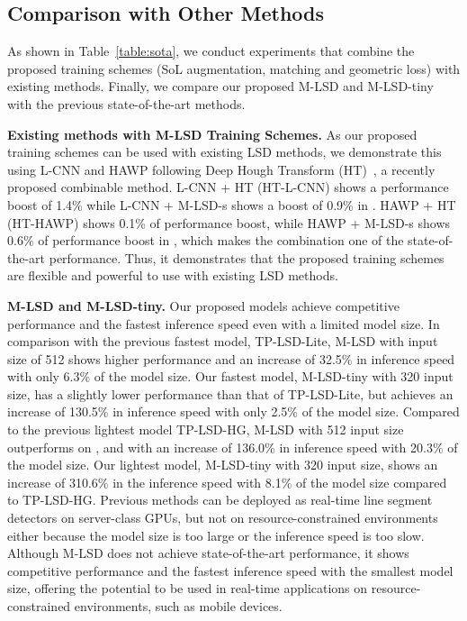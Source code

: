 \documentclass[letterpaper]{article} \usepackage{aaai22}  \usepackage{times}  \usepackage{helvet}  \usepackage{courier}  \usepackage[hyphens]{url}  \usepackage{graphicx} \urlstyle{rm} \def\UrlFont{\rm}  \usepackage{natbib}  \usepackage{caption} \DeclareCaptionStyle{ruled}{labelfont=normalfont,labelsep=colon,strut=off} \frenchspacing  \setlength{\pdfpagewidth}{8.5in}  \setlength{\pdfpageheight}{11in}  \usepackage{algorithm}
\begin{document}
\subsection{Comparison with Other Methods}
\label{sec:sota}
As shown in Table~\ref{table:sota}, we conduct experiments that combine the proposed training schemes (SoL augmentation, matching and geometric loss) with existing methods.
Finally, we compare our proposed M-LSD and M-LSD-tiny with the previous state-of-the-art methods.

\textbf{Existing methods with M-LSD Training Schemes. }
As our proposed training schemes can be used with existing LSD methods, we demonstrate this using L-CNN and HAWP following Deep Hough Transform (HT)~\cite{lin2020deep}, a recently proposed combinable method.
L-CNN + HT (HT-L-CNN) shows a performance boost of 1.4\% while L-CNN + M-LSD-s shows a boost of 0.9\% in .
HAWP + HT (HT-HAWP) shows 0.1\% of performance boost, while HAWP + M-LSD-s shows 0.6\% of performance boost in , which makes the combination one of the state-of-the-art performance.
Thus, it demonstrates that the proposed training schemes are flexible and powerful to use with existing LSD methods.

\textbf{M-LSD and M-LSD-tiny. }
Our proposed models achieve competitive performance and the fastest inference speed even with a limited model size.
In comparison with the previous fastest model, TP-LSD-Lite, M-LSD with input size of 512 shows higher performance and an increase of 32.5\% in inference speed with only 6.3\% of the model size.
Our fastest model, M-LSD-tiny with 320 input size, has a slightly lower performance than that of TP-LSD-Lite, but achieves an increase of 130.5\% in inference speed with only 2.5\% of the model size.
Compared to the previous lightest model TP-LSD-HG, M-LSD with 512 input size outperforms on ,  and  with an increase of 136.0\% in inference speed with 20.3\% of the model size.
Our lightest model, M-LSD-tiny with 320 input size, shows an increase of 310.6\% in the inference speed with 8.1\% of the model size compared to TP-LSD-HG.
Previous methods can be deployed as real-time line segment detectors on server-class GPUs, but not on resource-constrained environments either because the model size is too large or the inference speed is too slow.
Although M-LSD does not achieve state-of-the-art performance, it shows competitive performance and the fastest inference speed with the smallest model size, offering the potential to be used in real-time applications on resource-constrained environments, such as mobile devices.
\end{document}
